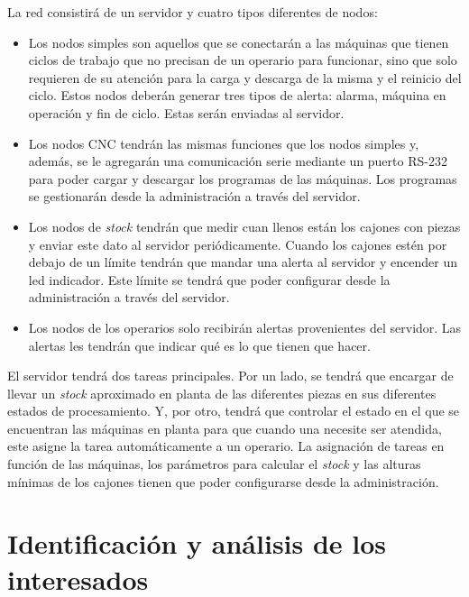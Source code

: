 \documentclass[11pt]{charter}
\begin{document}
La red consistirá de un servidor y cuatro tipos diferentes de nodos:
\begin{itemize}
    \item Los nodos simples son aquellos que se conectarán a las máquinas que tienen ciclos de trabajo que no precisan de un operario para funcionar, sino que solo requieren de su atención para la carga y descarga de la misma y el reinicio del ciclo. Estos nodos deberán generar tres tipos de alerta: alarma, máquina en operación y fin de ciclo. Estas serán enviadas al servidor.
    \item Los nodos CNC tendrán las mismas funciones que los nodos simples y, además, se le agregarán una comunicación serie mediante un puerto RS-232 para poder cargar y descargar los programas de las máquinas. Los programas se gestionarán desde la administración a través del servidor.
    \item Los nodos de \textit{stock} tendrán que medir cuan llenos están los cajones con piezas y enviar este dato al servidor periódicamente. Cuando los cajones estén por debajo de un límite tendrán que mandar una alerta al servidor y encender un led indicador. Este límite se tendrá que poder configurar desde la administración a través del servidor. 
    \item Los nodos de los operarios solo recibirán alertas provenientes del servidor. Las alertas les tendrán que indicar qué es lo que tienen que hacer. 
\end{itemize}
El servidor tendrá dos tareas principales. Por un lado, se tendrá que encargar de llevar un \textit{stock} aproximado en planta de las diferentes piezas en sus diferentes estados de procesamiento. Y, por otro, tendrá que controlar el estado en el que se encuentran las máquinas en planta para que cuando una necesite ser atendida, este asigne la tarea automáticamente a un operario. La asignación de tareas en función de las máquinas, los parámetros para calcular el \textit{stock} y las alturas mínimas de los cajones tienen que poder configurarse desde la administración.     


\section{Identificación y análisis de los interesados}
\label{sec:interesados}
\end{document}
